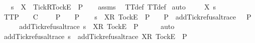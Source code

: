 \begin{isabellebody}
\ \ \ {\isachardoublequoteopen}s\ {\isacharat}\ {\isacharbrackleft}{\isacharbrackleft}X\ {\isasymunion}\ {\isacharbraceleft}Tick{\isacharbraceright}{\isacharbrackright}\isactrlsub R{\isacharcomma}{\isacharbrackleft}Tock{\isacharbrackright}\isactrlsub E{\isacharbrackright}\ {\isasymin}\ P{\isachardoublequoteclose}\isanewline
%
\isadelimproof
\ \ %
\endisadelimproof
%
\isatagproof
{}\isamarkupfalse%
\ assms\ \isamarkupfalse%
\ TT{}{\isacharunderscore}def\ TT{}{\isacharunderscore}def\isanewline
{}\isamarkupfalse%
\ {\isacharparenleft}auto{\isacharparenright}\isanewline
\ \ \isamarkupfalse%
\ {\isasymrho}\ X\ s\isanewline
\ \ \isamarkupfalse%
\ TT{}{\isacharunderscore}P{\isacharcolon}\ {\isachardoublequoteopen}{\isasymforall}{\isasymrho}{\isachardot}\ {\isacharparenleft}{\isasymexists}{\isasymsigma}{\isachardot}\ {\isasymrho}\ {\isasymlesssim}\isactrlsub C\ {\isasymsigma}\ {\isasymand}\ {\isasymsigma}\ {\isasymin}\ P{\isacharparenright}\ {\isasymlongrightarrow}\ {\isasymrho}\ {\isasymin}\ P{\isachardoublequoteclose}\isanewline
\ \ \isamarkupfalse%
\ {\isachardoublequoteopen}s\ {\isacharat}\ {\isacharbrackleft}{\isacharbrackleft}X{\isacharbrackright}\isactrlsub R{\isacharcomma}\ {\isacharbrackleft}Tock{\isacharbrackright}\isactrlsub E{\isacharbrackright}\ {\isasymin}\ P{\isachardoublequoteclose}\ {\isachardoublequoteopen}{\isasymforall}{\isasymrho}{\isachardot}\ {\isasymrho}\ {\isasymin}\ P\ {\isasymlongrightarrow}\ add{\isacharunderscore}Tick{\isacharunderscore}refusal{\isacharunderscore}trace\ {\isasymrho}\ {\isasymin}\ P{\isachardoublequoteclose}\isanewline
\ \ \isamarkupfalse%
\ \isamarkupfalse%
\ {\isachardoublequoteopen}add{\isacharunderscore}Tick{\isacharunderscore}refusal{\isacharunderscore}trace\ {\isacharparenleft}s\ {\isacharat}\ {\isacharbrackleft}{\isacharbrackleft}X{\isacharbrackright}\isactrlsub R{\isacharcomma}\ {\isacharbrackleft}Tock{\isacharbrackright}\isactrlsub E{\isacharbrackright}{\isacharparenright}\ {\isasymin}\ P{\isachardoublequoteclose}\isanewline
\ \ \ \ \isamarkupfalse%
\ auto\isanewline
\ \ \isamarkupfalse%
\ \isamarkupfalse%
\ {\isachardoublequoteopen}add{\isacharunderscore}Tick{\isacharunderscore}refusal{\isacharunderscore}trace\ s\ {\isacharat}\ add{\isacharunderscore}Tick{\isacharunderscore}refusal{\isacharunderscore}trace\ {\isacharparenleft}{\isacharbrackleft}{\isacharbrackleft}X{\isacharbrackright}\isactrlsub R{\isacharcomma}\ {\isacharbrackleft}Tock{\isacharbrackright}\isactrlsub E{\isacharbrackright}{\isacharparenright}\ {\isasymin}\ P{\isachardoublequoteclose}\isanewline

\end{isabellebody}
